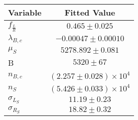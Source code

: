 \begin{tabular}[t]{lc}
\hline
Variable &Fitted Value\\
\hline\hline
$f_{\frac{L}{R}}$&$0.465\pm0.025$\\
\hline
$\lambda_{B,c}$&$-0.00047\pm0.00010$\\
\hline
$\mu_S$&$5278.892\pm0.081$\\
\hline
B&$5320\pm67$\\
\hline
$n_{B,c}$&$(2.257\pm0.028)\times 10^4$\\
\hline
$n_S$&$(5.426\pm0.033)\times 10^4$\\
\hline
$\sigma_{L_S}$&$11.19\pm0.23$\\
\hline
$\sigma_{R_S}$&$18.82\pm0.32$\\
\hline
\end{tabular}